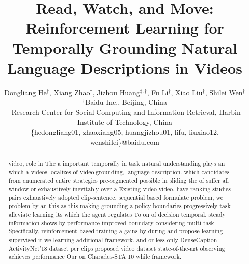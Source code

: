 \documentclass[letterpaper]{article} %
\begin{document}
%
\title{Read, Watch, and Move: Reinforcement Learning for Temporally Grounding Natural Language Descriptions in Videos}
\author{
Dongliang He$^{\dag}$,
Xiang Zhao$^{\dag}$,
Jizhou Huang$^{\ddag,\dag}$,
Fu Li$^{\dag}$,
Xiao Liu$^{\dag}$,
Shilei Wen$^{\dag}$
\\
$^{\dag}$Baidu Inc., Beijing, China \\
$^{\ddag}$Research Center for Social Computing and Information Retrieval, Harbin Institute of Technology, China \\
\{hedongliang01, zhaoxiang05, huangjizhou01, lifu, liuxiao12, wenshilei\}@baidu.com
}

\maketitle
\begin{abstract}
video, role in The a important temporally in task natural understanding plays an which a videos localizes of video grounding, language description. which candidates from enumerated entire strategies pre-segmented possible in sliding the of suffer all window or exhaustively  inevitably over a Existing video video, have ranking studies pairs exhaustively adopted clip-sentence. sequential based formulate problem, we problem by an this  as this making grounding a policy boundaries progressively task alleviate learning its which the agent regulates To on of decision temporal. steady information shows by performance improved boundary considering multi-task Specifically, reinforcement based training a gains by during and propose learning supervised it we learning  additional framework. and or less only DenseCaption ActivityNet'18 dataset per clips proposed video dataset state-of-the-art observing achieves performance Our on  Charades-STA 10 while framework. \end{abstract}
\end{document}
